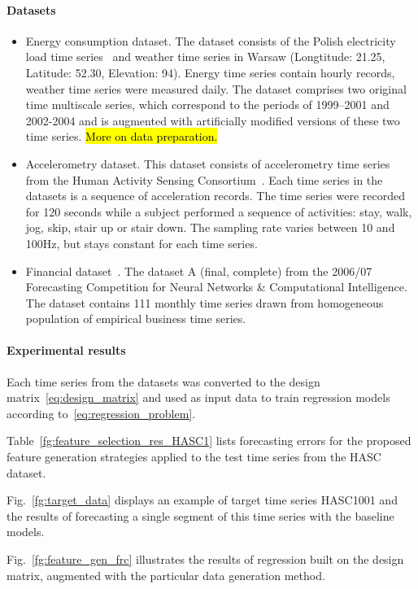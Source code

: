\documentclass[conference]{IEEEtran}
\begin{document}
\paragraph{Datasets}
\begin{itemize}
\item Energy consumption dataset. The dataset consists of the Polish electricity load time series~\cite{EnergyWeatherData} and weather time series in Warsaw (Longtitude: 21.25, Latitude: 52.30, Elevation: 94). Energy time series contain hourly records, weather time series were measured daily. The dataset comprises two original time multiscale series, which correspond to the periods of 1999--2001 and 2002-2004 and is augmented with artificially modified versions of these two time series. \hl{More on data preparation.}
\item Accelerometry dataset. This dataset consists of accelerometry time series from the Human Activity Sensing Consortium~\cite{HASCdata}. Each time series in the datasets is a sequence of acceleration records. The time series were recorded for 120 seconds while a subject performed a sequence of activities: stay, walk, jog, skip, stair up or stair down. The sampling rate varies between 10 and 100Hz, but stays constant for each time series.
\item Financial dataset~\cite{NNcompetition}.  The dataset A (final, complete) from the 2006/07 Forecasting Competition for Neural Networks \& Computational Intelligence. The dataset contains 111 monthly time series drawn from homogeneous population of empirical business time series.
\end{itemize}

\paragraph{Experimental results}
Each time series from the datasets was converted to the design matrix~\eqref{eq:design_matrix} and used as input data to train regression models according to~\eqref{eq:regression_problem}.

Table~\ref{fg:feature_selection_res_HASC1} lists forecasting errors for the proposed feature generation strategies applied to the test time series from the HASC dataset.

Fig.~\ref{fg:target_data} displays an example of target time series HASC1001 and the results of forecasting a single segment of this time series with the baseline models.

Fig.~\ref{fg:feature_gen_frc} illustrates the results of regression built on the design matrix, augmented with the particular data generation method.
\end{document}

